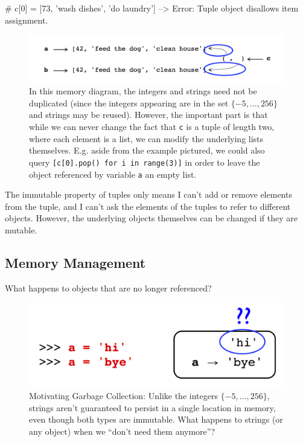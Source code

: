 \documentclass[12pt,letterpaper,twoside]{article}
\begin{document}
\begin{enumerate}
\begin{python}
# c[0] = [73, 'wash dishes', 'do laundry'] --> Error: Tuple object disallows item assignment.
\end{python}

\begin{figure}[h]
\centering
\includegraphics[scale=0.45]{fig/tuples-and-immutability.png}
\caption{\footnotesize In this memory diagram, the integers and strings need not be duplicated 
(since the integers appearing are in the set $\{-5, \ldots, 256\}$ and strings may
be reused). However, the important part is that while we can never change the fact that 
\texttt{c} is a tuple of length two, where each element is a list, we can modify the underlying
lists themselves. E.g. aside from the example pictured, we could also query 
\texttt{[c[0].pop() for i in range(3)]} in order to leave the object referenced by variable 
\texttt{a} an empty list.}
\end{figure}

The immutable property of tuples only means I can't add or remove elements from the tuple, and I can't
ask the elements of the tuples to refer to different objects. However, the underlying objects themselves
can be changed if they are mutable.

\subsection{Memory Management}
What happens to objects that are no longer referenced?

\begin{figure}[h]
\centering
\includegraphics[scale=0.35]{fig/gc-1.png}
\caption{Motivating Garbage Collection: Unlike the integers $\{-5, \ldots, 256\}$, strings aren't guaranteed
to persist in a single location in memory, even though both types are immutable. What happens to strings (or any object) when we
``don't need them anymore''?}
\end{figure}


\end{enumerate}
\end{document}
